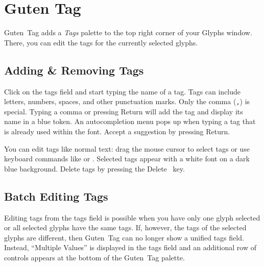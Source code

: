 \chapter{Guten Tag}%
\label{cha:guten_tag}
\BgThispage

\noindent Guten~Tag adds a \emph{Tags} palette to the top right corner of your Glyphs window.
There, you can edit the tags for the currently selected glyphs.

\bigbreak\noindent%
\bigbreak

\section{Adding \& Removing Tags}%
\label{sec:adding_and_removing_tags}

\hfill
{}\hfill
{}

\medbreak\noindent Click on the tags field and start typing the name of a tag.
Tags can include letters, numbers, spaces, and other punctuation marks.
Only the comma (\texttt{,}) is special.
Typing a comma or pressing Return will add the tag and display its name in a blue token.
An autocompletion menu pops up when typing a tag that is already used within the font.
Accept a suggestion by pressing Return.

\noindent%
\hfill
{}\hfill
{}\hfill

\medbreak\noindent You can edit tags like normal text: drag the mouse cursor to select tags or use keyboard commands like  or .
Selected tags appear with a white font on a dark blue background.
Delete tags by pressing the Delete~ key.

\section{Batch Editing Tags}%
\label{sec:batch_editing_tags}

Editing tags from the tags field is possible when you have only one glyph selected or all selected glyphs have the same tags.
If, however, the tags of the selected glyphs are different, then Guten~Tag can no longer show a unified tags field.
Instead, \enquote{Multiple Values} is displayed in the tags field and an additional row of controls appears at the bottom of the Guten~Tag palette.

